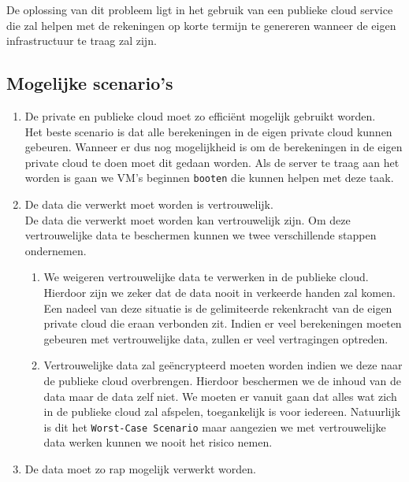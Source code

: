 \documentclass{article}
\begin{document}
De oplossing van dit probleem ligt in het gebruik van een publieke cloud service die zal helpen met de rekeningen op korte termijn te genereren wanneer de eigen infrastructuur te traag zal zijn.  


\subsection{Mogelijke scenario's}
\begin{enumerate}
    \item De private en publieke cloud moet zo efficiënt mogelijk gebruikt worden.\\
    
Het beste scenario is dat alle berekeningen in de eigen private cloud kunnen gebeuren.  Wanneer er dus nog mogelijkheid is om de berekeningen in de eigen private cloud te doen moet dit gedaan worden.  Als de server te traag aan het worden is gaan we VM's beginnen \texttt{booten} die kunnen helpen met deze taak.

    
    \item De data die verwerkt moet worden is vertrouwelijk.\\
    
De data die verwerkt moet worden kan vertrouwelijk zijn.  Om deze vertrouwelijke data te beschermen kunnen we twee verschillende stappen ondernemen.
        \begin{enumerate}
            \item We weigeren vertrouwelijke data te verwerken in de publieke cloud.  Hierdoor zijn we zeker dat de data nooit in verkeerde handen zal komen.  Een nadeel van deze situatie is de gelimiteerde rekenkracht van de eigen private cloud die eraan verbonden zit.  Indien er veel berekeningen moeten gebeuren met vertrouwelijke data, zullen er veel vertragingen optreden.
            \item Vertrouwelijke data zal geëncrypteerd moeten worden indien we deze naar de publieke cloud overbrengen.  Hierdoor beschermen we de inhoud van de data maar de data zelf niet.  We moeten er vanuit gaan dat alles wat zich in de publieke cloud zal afspelen, toegankelijk is voor iedereen.  Natuurlijk is dit het \texttt{Worst-Case Scenario} maar aangezien we met vertrouwelijke data werken kunnen we nooit het risico nemen.
        \end{enumerate}
    
    \item De data moet zo rap mogelijk verwerkt worden.\\


\end{enumerate}
\end{document}
